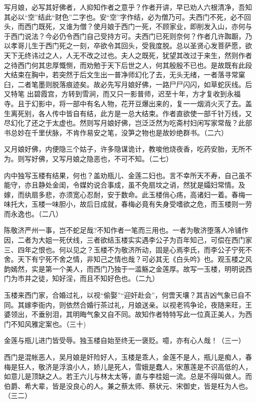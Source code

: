 {写月娘，必写其好佛者，人抑知作者之意乎？作者开讲，早已劝人六根清净，吾知其必以“空”结此“财色”二字也。安“空”字作结，必为僧乃可。夫西门不死，必不回头，而西门既死，又谁为僧？使月娘于西门一死，不顾家业，即削发入山，亦何与于西门说法？今必仍令西门自己受持方可。夫西门已死则奈何？作者几许踟蹰，乃以孝哥儿生于西门死之一刻，卒欲令其回头，受我度脱。总以圣贤心发菩萨愿，欲天下无终讳过之人，人无不改之过也。夫人之既死，犹望其改过于来生，然则作者之待西门何其忠厚慨恻，而劝勉于天下后世之人，何其殷殷不已也。是故既有此段大结束在胸中，若突然于后文生出一普净师幻化了去，无头无绪，一者落寻常窠臼，二者笔墨则脱落痕迹矣。故必先写月娘好佛，一路尸尸闪闪，如草蛇灰线。后又特笔
出碧霞宫，方转到雪涧，而又只一影普师，迟至十年，方才复收到永福寺。且于幻影中，将一部中有名人物，花开豆爆出来的，复一一烟消火灭了去。盖生离死别，各人传中皆自有结，此方是一总大结束。作者直欲使一部千针万线，又尽幻化了还之于太虚也。然则写月娘好佛，岂泛泛然为吃斋村妇闲写家常哉？此部书总妙在千里伏脉，不肯作易安之笔，没笋之物也是故妙绝群书。（二六）

又月娘好佛，内便隐三个姑子，许多隐谋诡计，教唆他烧夜香，吃药安胎，无所不为。则写好佛，又写月娘之隐恶也，不可不知。（二七）

内中独写玉楼有结果，何也？盖劝瓶儿、金莲二妇也。言不幸所天不寿，自己虽不能守，亦且静处金闺，令媒妁说合事成，虽不免扇坟之诮，然犹是孀妇常情。及嫁，而纨扇多悲，亦须宽心忍耐，安于数命。此玉楼俏心疡，高诸妇一着。春梅一味托大，玉楼一味胆小，故后日成就，春梅必竟有失身受嗜欲之危，而玉楼则一劳而永逸也。（二八）

陈敬济严州一事，岂不蛇足哉?不知作者一笔而三用也。一者为敬济堕落人冷铺作因，二者为大姐一死伏线，三者欲结玉楼实实遇李公子为百年知己，可偿在西门家三、四年之恨也。何以见之？玉楼不为敬济所动，固是心焉李氏，而李公子宁死不舍。天下有宁死不舍之情，非知己之情也哉？可必其无《白头吟》也。观玉楼之风韵嫣然，实是第一个美人，而西门乃独于一滥觞之金莲厚。故写一玉楼，明明说西门为市井之徒，知好淫，而且不知好色也。（二九）

玉楼来西门家，合婚过礼，以视“偷娶”“迎奸赴会”，何啻天壤？其吉凶气象已自不同。其嫁李衙内，则依然合婚行茶过礼，月娘送亲。以视老鸨争论，夜随来旺，王婆领出，不垂别泪，其明晦气象又自不同。故知作者特特写此一位真正美人，为西门不知风雅定案也。（三十)

金莲与瓶儿进门皆受辱。独玉楼自始至终无一褒贬。噫，亦有心人哉！（三一）

西门是混帐恶人，吴月娘是奸险好人，玉楼是乖人，金莲不是人，瓶儿是痴人，春梅是狂人，敬济是浮浪小人，娇儿是死人，雪娥是蠢人，宋蕙莲是不识高低的人，如意儿是顶缺之人。若王六儿与林太太等，直与李桂姐一流。总是不得叫做人。而伯爵、希大辈，皆是没良心的人。兼之蔡太师、蔡状元、宋御史，皆是枉为人也。（三二）

}
